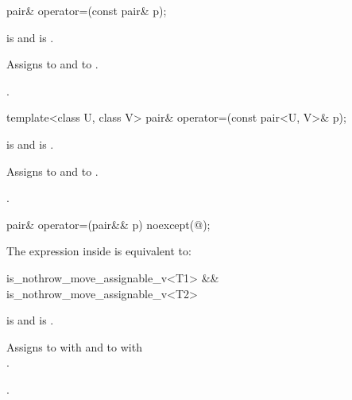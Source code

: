 %
\begin{itemdecl}
pair& operator=(const pair& p);
\end{itemdecl}

\begin{itemdescr}
\pnum
\requires {} is 
and  is .

\pnum
\effects Assigns  to  and  to .

\pnum
\returns {}.
\end{itemdescr}

%
\begin{itemdecl}
template<class U, class V> pair& operator=(const pair<U, V>& p);
\end{itemdecl}

\begin{itemdescr}
\pnum
\requires {} is 
and  is .

\pnum
\effects Assigns  to  and  to .

\pnum
\returns {}.
\end{itemdescr}

%
\begin{itemdecl}
pair& operator=(pair&& p) noexcept(@\seebelow@);
\end{itemdecl}

\begin{itemdescr}
\pnum
\remarks The expression inside  is equivalent to:

\begin{codeblock}
is_nothrow_move_assignable_v<T1> && is_nothrow_move_assignable_v<T2>
\end{codeblock}

\pnum
\requires {} is 
and  is .

\pnum
\effects
Assigns to  with 
and to  with\\ .

\pnum
\returns {}.
\end{itemdescr}

